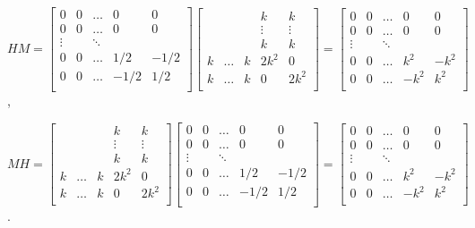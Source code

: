 \begin{dokaz}
\begin{center}
$
HM = 
\begin{bmatrix}
0 & 0 & \ldots & 0 & 0 \\
0 & 0 & \ldots & 0 & 0 \\
\vdots && \ddots \\
0 & 0 & \ldots & 1/2 & -1/2 \\
0 & 0 & \ldots & -1/2 & 1/2 \\
\end{bmatrix}
\begin{bmatrix}
&&& k & k \\
&&& \vdots & \vdots \\
&&& k & k \\
k & \ldots & k & 2k^2 & 0 \\
k & \ldots & k & 0 & 2k^2 \\
\end{bmatrix}
=
\begin{bmatrix}
0 & 0 & \ldots & 0 & 0 \\
0 & 0 & \ldots & 0 & 0 \\
\vdots && \ddots \\
0 & 0 & \ldots & k^2 & -k^2 \\
0 & 0 & \ldots & -k^2 & k^2 \\
\end{bmatrix}
$,
\end{center}

\begin{center}
$
MH = 
\begin{bmatrix}
&&& k & k \\
&&& \vdots & \vdots \\
&&& k & k \\
k & \ldots & k & 2k^2 & 0 \\
k & \ldots & k & 0 & 2k^2 \\
\end{bmatrix}
\begin{bmatrix}
0 & 0 & \ldots & 0 & 0 \\
0 & 0 & \ldots & 0 & 0 \\
\vdots && \ddots \\
0 & 0 & \ldots & 1/2 & -1/2 \\
0 & 0 & \ldots & -1/2 & 1/2 \\
\end{bmatrix}
=
\begin{bmatrix}
0 & 0 & \ldots & 0 & 0 \\
0 & 0 & \ldots & 0 & 0 \\
\vdots && \ddots \\
0 & 0 & \ldots & k^2 & -k^2 \\
0 & 0 & \ldots & -k^2 & k^2 \\
\end{bmatrix}
$.
\end{center}


\end{dokaz}
